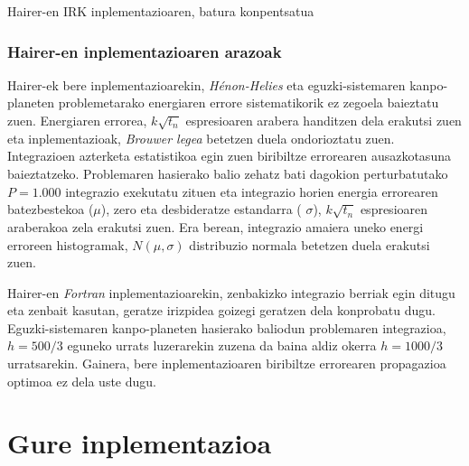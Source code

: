 \begin{algorithm}[h!]
  \caption{Hairer-en IRK inplementazioaren, batura konpentsatua}
  \label{alg:Hairer-BK}
\end{algorithm} 


\subsubsection*{Hairer-en inplementazioaren arazoak}

Hairer-ek bere inplementazioarekin, \emph{Hénon-Helies} eta eguzki-sistemaren kanpo-planeten problemetarako energiaren errore sistematikorik ez zegoela baieztatu zuen. Energiaren errorea, $k\sqrt{t_n}$ espresioaren arabera handitzen dela erakutsi zuen eta inplementazioak, \emph{Brouwer legea} \cite{Grazier2005} betetzen duela ondorioztatu zuen. Integrazioen azterketa estatistikoa egin zuen biribiltze errorearen ausazkotasuna baieztatzeko. Problemaren hasierako balio zehatz bati dagokion perturbatutako $P=1.000$ integrazio exekutatu zituen eta integrazio horien energia errorearen batezbestekoa ($\mu$), zero eta desbideratze estandarra ( $\sigma$), $k\sqrt{t_n}$ espresioaren araberakoa zela erakutsi zuen. Era berean, integrazio amaiera uneko energi erroreen histogramak, $N(\mu,\sigma)$ distribuzio normala betetzen duela erakutsi zuen.

Hairer-en \emph{Fortran} inplementazioarekin, zenbakizko integrazio berriak egin ditugu eta zenbait kasutan, geratze irizpidea goizegi geratzen dela konprobatu dugu. Eguzki-sistemaren kanpo-planeten hasierako baliodun problemaren integrazioa,  $h=500/3$ eguneko urrats luzerarekin zuzena da baina aldiz okerra $h=1000/3$ urratsarekin.  Gainera, bere inplementazioaren biribiltze errorearen propagazioa optimoa ez dela uste dugu. 


\section{Gure inplementazioa}

